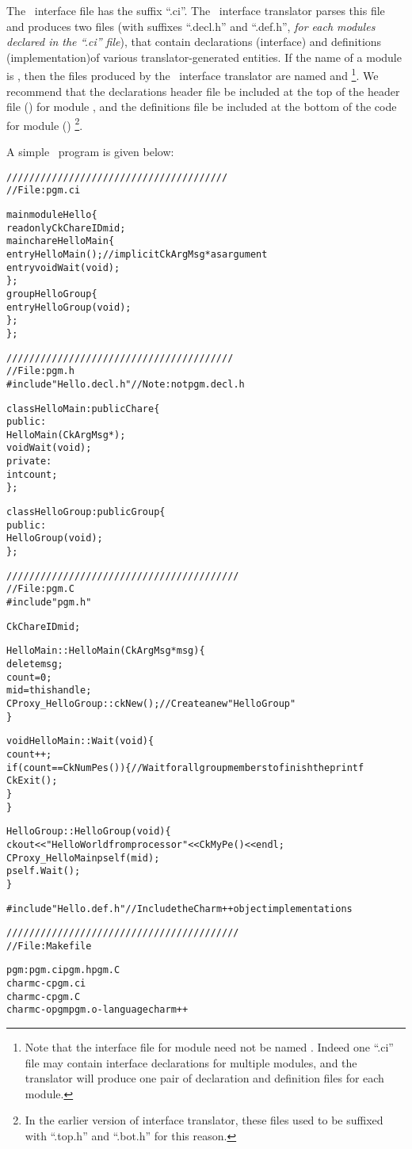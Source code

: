 The \charmpp\ interface file has the suffix ``.ci''.  The \charmpp\ interface
translator parses this file and produces two files (with suffixes ``.decl.h''
and ``.def.h'', {\em for each modules declared in the ``.ci'' file}), that
contain declarations (interface) and definitions (implementation)of various
translator-generated entities. If the name of a module is , then the
files produced by the \charmpp\ interface translator are named 
and \footnote{Note that the interface file for module 
need not be named . Indeed one ``.ci'' file may contain interface
declarations for multiple modules, and the translator will produce one pair of
declaration and definition files for each module.}.  We recommend that the
declarations header file be included at the top of the header file ()
for module , and the definitions file be included at the bottom of the
code for module () \footnote{In the earlier version of interface
translator, these files used to be suffixed with ``.top.h'' and ``.bot.h'' for
this reason.}.

A simple \charmpp\ program is given below:

\begin{alltt}
///////////////////////////////////////
// File: pgm.ci

mainmodule Hello \{
  readonly CkChareID mid;
  mainchare HelloMain \{
    entry HelloMain(); // implicit CkArgMsg * as argument
    entry void Wait(void);
  \};
  group HelloGroup \{
    entry HelloGroup(void);
  \};
\};

////////////////////////////////////////
// File: pgm.h
#include "Hello.decl.h" // Note: not pgm.decl.h

class HelloMain: public Chare \{
  public:
    HelloMain(CkArgMsg *);
    void Wait(void);
  private:
    int count;
\};

class HelloGroup: public Group \{
  public:
    HelloGroup(void);
\};

/////////////////////////////////////////
// File: pgm.C
#include "pgm.h"

CkChareID mid;

HelloMain::HelloMain(CkArgMsg *msg) \{
  delete msg;
  count = 0;
  mid = thishandle;
  CProxy_HelloGroup::ckNew(); // Create a new "HelloGroup"
\}

void HelloMain::Wait(void) \{
  count++;
  if (count == CkNumPes()) \{ // Wait for all group members to finish the printf
    CkExit();
  \}
\}

HelloGroup::HelloGroup(void) \{
  ckout << "Hello World from processor " << CkMyPe() << endl;
  CProxy_HelloMain pself(mid);
  pself.Wait();
\}

#include "Hello.def.h" // Include the Charm++ object implementations

/////////////////////////////////////////
// File: Makefile

pgm: pgm.ci pgm.h pgm.C
      charmc -c pgm.ci
      charmc -c pgm.C
      charmc -o pgm pgm.o -language charm++

\end{alltt}

